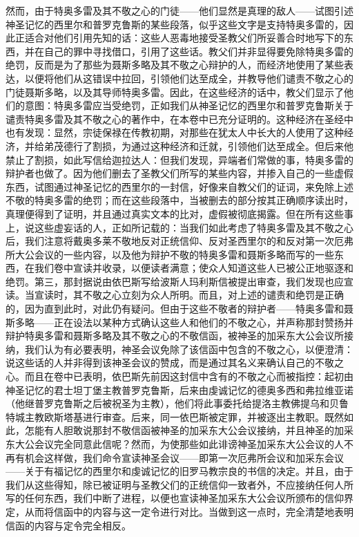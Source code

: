 然而，由于特奥多雷及其不敬之心的门徒——他们显然是真理的敌人——试图引述神圣记忆的西里尔和普罗克鲁斯的某些段落，似乎这些文字是支持特奥多雷的，因此正适合对他们引用先知的话：这些人恶毒地接受圣教父们所妥善合时地写下的东西，并在自己的罪中寻找借口，引用了这些话。教父们并非显得要免除特奥多雷的绝罚，反而是为了那些为聂斯多略及其不敬之心辩护的人，而经济地使用了某些表达，以便将他们从这错误中拉回，引领他们达至成全，并教导他们谴责不敬之心的门徒聂斯多略，以及其导师特奥多雷。因此，在这些经济的话中，教父们显示了他们的意图：特奥多雷应当受绝罚，正如我们从神圣记忆的西里尔和普罗克鲁斯关于谴责特奥多雷及其不敬之心的著作中，在本卷中已充分证明的。这种经济在圣经中也有发现：显然，宗徒保禄在传教初期，对那些在犹太人中长大的人使用了这种经济，并给弟茂德行了割损，为通过这种经济和迁就，引领他们达至成全。但后来他禁止了割损，如此写信给迦拉达人：但我们发现，异端者们常做的事，特奥多雷的辩护者也做了。因为他们删去了圣教父们所写的某些内容，并掺入自己的一些虚假东西，试图通过神圣记忆的西里尔的一封信，好像来自教父们的证词，来免除上述不敬的特奥多雷的绝罚；而在这些段落中，当被删去的部分按其正确顺序读出时，真理便得到了证明，并且通过真实文本的比对，虚假被彻底揭露。但在所有这些事上，说这些虚妄话的人，正如所记载的：当我们如此考虑了特奥多雷及其不敬之心后，我们注意将戴奥多莱不敬地反对正统信仰、反对圣西里尔的和反对第一次厄弗所大公会议的一些内容，以及他为辩护不敬的特奥多雷和聂斯多略而写的一些东西，在我们卷中宣读并收录，以便读者满意；使众人知道这些人已被公正地驱逐和绝罚。第三，那封据说由依巴斯写给波斯人玛利斯信被提出审查，我们发现也应宣读。当宣读时，其不敬之心立刻为众人所明。而且，对上述的谴责和绝罚是正确的，因为直到此时，对此仍有疑问。但由于这些不敬者的辩护者——特奥多雷和聂斯多略——正在设法以某种方式确认这些人和他们的不敬之心，并声称那封赞扬并辩护特奥多雷和聂斯多略及其不敬之心的不敬信函，被神圣的加采东大公会议所接纳，我们认为有必要表明，神圣会议免除了该信函中包含的不敬之心，以便澄清：说这些话的人并非得到该神圣会议的赞成，而是通过其名义来确认自己的不敬之心。而且在卷中已表明，依巴斯先前因这封信中含有的不敬之心而被指控：起初由神圣记忆的君士坦丁堡主教普罗克鲁斯，后来由虔诚记忆的德奥多西和弗拉维亚诺（他继普罗克鲁斯之后被祝圣为主教），他们将此事委托给提洛主教佛提乌和贝鲁特城主教欧斯塔基进行审查。后来，同一依巴斯被定罪，并被逐出主教职。既然如此，怎能有人胆敢说那封不敬信函被神圣的加采东大公会议接纳，并且神圣的加采东大公会议完全同意此信呢？然而，为使那些如此诽谤神圣加采东大公会议的人不再有机会这样做，我们命令宣读神圣会议——即第一次厄弗所会议和加采东会议——关于有福记忆的西里尔和虔诚记忆的旧罗马教宗良的书信的决定。并且，由于我们从这些得知，除已被证明与圣教父们的正统信仰一致者外，不应接纳任何人所写的任何东西，我们中断了进程，以便也宣读神圣加采东大公会议所颁布的信仰界定，从而将信函中的内容与这一定令进行对比。当做到这一点时，完全清楚地表明信函的内容与定令完全相反。\par

